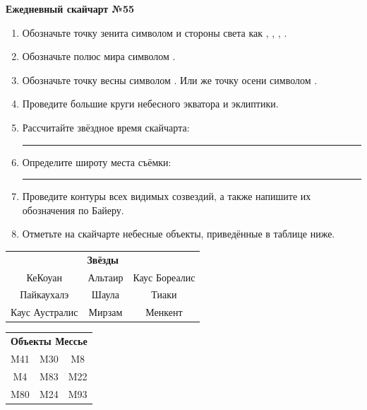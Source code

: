 \documentclass{./SAS-class-skygen}
\begin{document}
    
    
    
	\begin{center}
		\large\textbf{Ежедневный скайчарт №55}
	\end{center}

	\begin{enumerate}
		\item Обозначьте точку зенита символом  и стороны света как , , , .
		\item Обозначьте полюс мира символом .
		\item Обозначьте точку весны символом \Aries. Или же точку осени символом \Libra.
		\item Проведите большие круги небесного экватора и эклиптики.
		\item Рассчитайте звёздное время скайчарта: \rule{2cm}{0.4pt}
		\item Определите широту места съёмки: \rule{2cm}{0.4pt}
		\item Проведите контуры всех видимых созвездий, а также напишите их обозначения по Байеру.
		\item Отметьте на скайчарте небесные объекты, приведённые в таблице ниже.
	\end{enumerate}
	
    \vspace{0.5cm}

    \begin{table}[h!]
    \centering
    \begin{tabular}{ccc}
    \multicolumn{3}{c}{\textbf{Звёзды}} \\ КеКоуан & Альтаир & Каус Бореалис \\
Пайкаухалэ & Шаула & Тиаки \\
Каус Аустралис & Мирзам & Менкент \\

\end{tabular}
    \hfill
    \begin{tabular}{ccc}
    \multicolumn{3}{c}{\textbf{Объекты Мессье}} \\ M41 & M30 & M8 \\
M4 & M83 & M22 \\
M80 & M24 & M93 \\

\end{tabular}
    \end{table}
	
\end{document}
